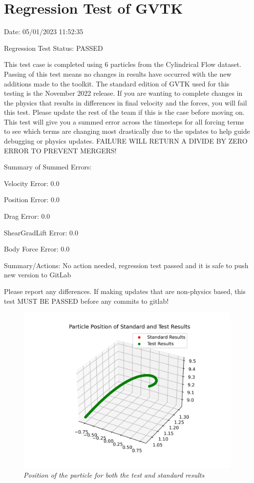 \documentclass{article}
\begin{document}
\section{Regression Test of GVTK}
Date: 05/01/2023 11:52:35

\vspace{5pt}

\noindent Regression Test Status: PASSED

\vspace{5pt}

\noindent This test case is completed using 6 particles from the Cylindrical Flow dataset. Passing of this test means no changes in results have occurred with the new additions made to the toolkit.
The standard edition of GVTK used for this testing is the November 2022 release. If you are wanting to complete changes in the physics that results in differences in final velocity and the forces,
you will fail this test. Please update the rest of the team if this is the case before moving on. This test will give you a summed error across the timesteps for all forcing terms to see which terms
are changing most drastically due to the updates to help guide debugging or physics updates. FAILURE WILL RETURN A DIVIDE BY ZERO ERROR TO PREVENT MERGERS!



\vspace{5pt}

\noindent Summary of Summed Errors:
\vspace{5pt}

Velocity Error: 0.0

Position Error: 0.0

Drag Error: 0.0

ShearGradLift Error: 0.0

Body Force Error: 0.0

\vspace{5pt}

\noindent Summary/Actions: No action needed, regression test passed and it is safe to push new version to GitLab

\vspace{5pt}

\noindent Please report any differences. If making updates that are non-physics based, this test MUST BE PASSED before any commits to gitlab!

\begin{figure}[htbp]
\centering
\includegraphics[width=1.0\textwidth]{Position.png}
\caption{\textit{Position of the particle for both the test and standard results}}
\label{fig:postion}
\end{figure}
\end{document}
